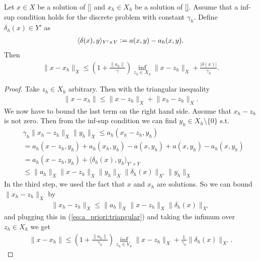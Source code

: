 \documentclass[../master_thesis.tex]{subfiles}
\begin{document}
\begin{lemma}
    Let $x \in X$ be a solution of \ref{} and $x_h \in X_h$ be a solution of \ref{}.
    Assume that a inf-sup condition holds for the discrete problem with constant 
    $\gamma_h$.
    Define $\delta_h(x) \in Y'$ as 
    \begin{align*}
        \langle \delta(x), y \rangle_{Y'\times Y} 
        \vcentcolon= a(x,y) - a_h(x,y).
    \end{align*}
    Then
    \begin{align*}
        \lVert x - x_h \rVert _X 
        \leq \left( 1 + \frac{\lVert a_h \rVert}{\gamma} \right) 
            \inf_{z_h \in X_h} \lVert x - z_h\rVert _X + \frac{|\delta(x)|}{\gamma_h}.
    \end{align*}
\end{lemma}
\begin{proof}
    Take $z_h \in X_h$ arbitrary. Then with the triangular inequality
    \begin{align}
        \lVert x - x_h \rVert \leq \lVert x - z_h \rVert _X + \lVert x_h - z_h \rVert _X. \label{eq:a_priori:triangular}
    \end{align}
    We now have to bound the last term on the right hand side.
    Assume that $x_h - z_h$ is not zero. Then from the inf-sup condition 
    we can find $y_h \in X_h \setminus \{0\}$ s.t. 
    \begin{align*}
        &\gamma_h \lVert x_h - z_h \rVert _X \lVert y_h \rVert _X
        \leq a_h(x_h-z_h, y_h) 
        \\ &= a_h(x-z_h, y_h) + a_h(x_h, y_h) - a(x, y_h) + a(x, y_h) - a_h(x, y_h) 
        \\ &= a_h(x-z_h, y_h) + \langle \delta_h(x), y_h \rangle_{Y'\times Y} 
        \\ &\leq \lVert a_h \rVert _X \lVert x- z_h \rVert _X \lVert y_h \rVert _X
            \lVert \delta_h(x) \rVert _{X'}  \lVert y_h \rVert _X
    \end{align*}
    In the third step, we used the fact that $x$ and $x_h$ are solutions.
    So we can bound $\lVert x_h - z_h \rVert _X$ by 
    \begin{align*}
        \lVert x_h - z_h \rVert _X
        \leq \lVert a_h \rVert _X \lVert x- z_h \rVert _X 
            \lVert \delta_h(x) \rVert _{X'}  
    \end{align*}
    and plugging this in (\ref{eq:a_priori:triangular}) and taking the infimum 
    over $z_h \in X_h$ we get 
    \begin{align*}
        \lVert x - x_h \rVert 
        \leq \left( 1 + \frac{\lVert a_h \rVert}{\gamma_h} \right) \inf _{z_h \in V_h}\lVert x - z_h \rVert _X 
            + \frac{1}{\gamma_h}\lVert \delta_h(x) \rVert _{X'}.
    \end{align*}
\end{proof}
\end{document}
